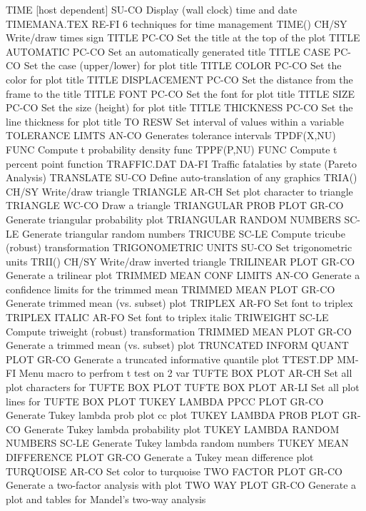 TIME  [host dependent]      SU-CO Display (wall clock) time and date
TIMEMANA.TEX                RE-FI 6 techniques for time management
TIME()                      CH/SY Write/draw times sign
TITLE                       PC-CO Set the title at the top of the plot
TITLE AUTOMATIC             PC-CO Set an automatically generated title
TITLE CASE                  PC-CO Set the case (upper/lower) for plot title
TITLE COLOR                 PC-CO Set the color for plot title
TITLE DISPLACEMENT          PC-CO Set the distance from the frame to the title
TITLE FONT                  PC-CO Set the font for plot title
TITLE SIZE                  PC-CO Set the size (height) for plot title
TITLE THICKNESS             PC-CO Set the line thickness for plot title
TO                          RESW  Set interval of values within a variable
TOLERANCE LIMTS             AN-CO Generates tolerance intervals
TPDF(X,NU)                  FUNC  Compute t probability density func
TPPF(P,NU)                  FUNC  Compute t percent point function
TRAFFIC.DAT                 DA-FI Traffic fatalaties by state (Pareto Analysis)
TRANSLATE                   SU-CO Define auto-translation of any graphics
TRIA()                      CH/SY Write/draw triangle
TRIANGLE                    AR-CH Set plot character to triangle
TRIANGLE                    WC-CO Draw a triangle
TRIANGULAR PROB PLOT        GR-CO Generate triangular probability plot
TRIANGULAR RANDOM NUMBERS   SC-LE Generate triangular random numbers
TRICUBE                     SC-LE Compute tricube (robust) transformation
TRIGONOMETRIC UNITS         SU-CO Set trigonometric units
TRII()                      CH/SY Write/draw inverted triangle
TRILINEAR PLOT              GR-CO Generate a trilinear plot
TRIMMED MEAN CONF LIMITS    AN-CO Generate a confidence limits for the trimmed mean
TRIMMED MEAN PLOT           GR-CO Generate trimmed mean (vs. subset) plot
TRIPLEX                     AR-FO Set font to triplex
TRIPLEX ITALIC              AR-FO Set font to triplex italic
TRIWEIGHT                   SC-LE Compute triweight (robust) transformation
TRIMMED MEAN PLOT           GR-CO Generate a trimmed mean (vs. subset) plot
TRUNCATED INFORM QUANT PLOT GR-CO Generate a truncated informative quantile plot
TTEST.DP                    MM-FI Menu macro to perfrom t test on 2 var
TUFTE BOX PLOT              AR-CH Set all plot characters for TUFTE BOX PLOT
TUFTE BOX PLOT              AR-LI Set all plot lines for TUFTE BOX PLOT
TUKEY LAMBDA PPCC PLOT      GR-CO Generate Tukey lambda prob plot cc plot
TUKEY LAMBDA PROB PLOT      GR-CO Generate Tukey lambda probability plot
TUKEY LAMBDA RANDOM NUMBERS SC-LE Generate Tukey lambda random numbers
TUKEY MEAN DIFFERENCE PLOT  GR-CO Generate a Tukey mean difference plot
TURQUOISE                   AR-CO Set color to turquoise
TWO FACTOR PLOT             GR-CO Generate a two-factor analysis with plot
TWO WAY PLOT                GR-CO Generate a plot and tables for Mandel's two-way analysis

